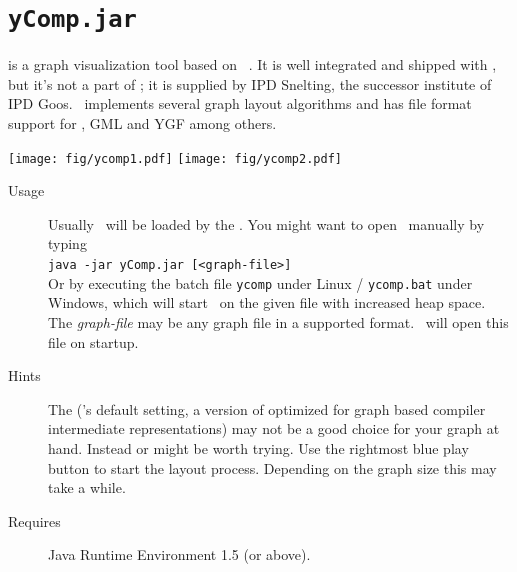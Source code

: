 \section{\texttt{yComp.jar}}
\label{tools:ycomp}
\yComp{} \cite{ycomp} is a graph visualization tool based on \yFiles\ \cite{yfiles}.
It is well integrated and shipped with \GrG, but it's not a part of \GrG; it is supplied by IPD Snelting, the successor institute of IPD Goos.%
\yComp\ implements several graph layout algorithms and has file format support for , GML and YGF among others.
\begin{center}
\texttt{[image: fig/ycomp1.pdf]} \texttt{[image: fig/ycomp2.pdf]}
\end{center}
\begin{description}
  \item[Usage] Usually \yComp\ will be loaded by the \GrShell. You might want to open \yComp\ manually by typing\\
   \texttt{java -jar yComp.jar [<graph-file>]}\\
  Or by executing the batch file \texttt{ycomp} under Linux / \texttt{ycomp.bat} under Windows,
  which will start \yComp\ on the given file with increased heap space.
  The \emph{graph-file} may be any graph file in a supported format. \yComp\ will open this file on startup.
  \item[Hints] The   (\yComp's default setting, a version of \texttt{} optimized for graph based compiler intermediate representations) may not be a good choice for your graph at hand.
  Instead \texttt{} or \texttt{} might be worth trying.
  Use the rightmost blue play button to start the layout process. Depending on the graph size this may take a while.
  \item[Requires] Java Runtime Environment 1.5 (or above).
\end{description}

